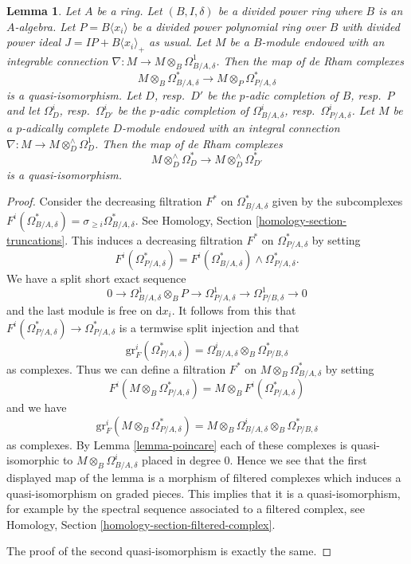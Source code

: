 \documentclass{stacks-project}
\theoremstyle{plain}
\newtheorem{lemma}[subsection]{Lemma}
\theoremstyle{definition}
\theoremstyle{remark}
\numberwithin{equation}{subsection}
\begin{document}
\begin{lemma}
\label{lemma-relative-poincare}
Let $A$ be a ring. Let $(B, I, \delta)$ be a divided power ring
where $B$ is an $A$-algebra.
Let $P = B\langle x_i \rangle$ be a divided power polynomial
ring over $B$ with divided power ideal $J = IP + B\langle x_i \rangle_{+}$
as usual. Let $M$ be a $B$-module endowed with an integrable connection
$\nabla : M \to M \otimes_B \Omega^1_{B/A, \delta}$. Then the map of
de Rham complexes
$$
M \otimes_B \Omega^*_{B/A, \delta}
\longrightarrow
M \otimes_P \Omega^*_{P/A, \delta}
$$
is a quasi-isomorphism. Let $D$, resp.\ $D'$ be the $p$-adic completion of
$B$, resp.\ $P$ and let $\Omega^i_D$, resp.\ $\Omega^i_{D'}$ be the $p$-adic
completion of $\Omega^i_{B/A, \delta}$,
resp.\ $\Omega^i_{P/A, \delta}$. Let $M$ be a $p$-adically complete
$D$-module endowed with an integral connection
$\nabla : M \to M \otimes^\wedge_D \Omega^1_D$.
Then the map of de Rham complexes
$$
M \otimes^\wedge_D \Omega^*_D
\longrightarrow
M \otimes^\wedge_D \Omega^*_{D'}
$$
is a quasi-isomorphism.
\end{lemma}

\begin{proof}
Consider the decreasing filtration $F^*$ on $\Omega^*_{B/A, \delta}$
given by the subcomplexes
$F^i(\Omega^*_{B/A, \delta}) = \sigma_{\geq i}\Omega^*_{B/A, \delta}$.
See Homology, Section \ref{homology-section-truncations}.
This induces a decreasing filtration $F^*$ on $\Omega^*_{P/A, \delta}$
by setting
$$
F^i(\Omega^*_{P/A, \delta}) =
F^i(\Omega^*_{B/A, \delta}) \wedge \Omega^*_{P/A, \delta}.
$$
We have a split short exact sequence
$$
0 \to \Omega^1_{B/A, \delta} \otimes_B P \to
\Omega^1_{P/A, \delta} \to
\Omega^1_{P/B, \delta} \to 0
$$
and the last module is free on $\text{d}x_i$. It follows from this that
$F^i(\Omega^*_{P/A, \delta}) \to \Omega^*_{P/A, \delta}$ is a termwise
split injection and that
$$
\text{gr}^i_F(\Omega^*_{P/A, \delta}) =
\Omega^i_{B/A, \delta} \otimes_B \Omega^*_{P/B, \delta}
$$
as complexes. Thus we can define a filtration $F^*$ on
$M \otimes_B \Omega^*_{B/A, \delta}$ by setting
$$
F^i(M \otimes_B \Omega^*_{P/A, \delta}) =
M \otimes_B F^i(\Omega^*_{P/A, \delta})
$$
and we have
$$
\text{gr}^i_F(M \otimes_B \Omega^*_{P/A, \delta}) =
M \otimes_B \Omega^i_{B/A, \delta} \otimes_B \Omega^*_{P/B, \delta}
$$
as complexes.
By Lemma \ref{lemma-poincare} each of these complexes is
quasi-isomorphic to $M \otimes_B \Omega^i_{B/A, \delta}$ placed in degree $0$.
Hence we see that the first displayed map of the lemma is a morphism of
filtered complexes which induces a quasi-isomorphism on graded pieces. This
implies that it is a quasi-isomorphism, for example by the spectral sequence
associated to a filtered complex, see
Homology, Section \ref{homology-section-filtered-complex}.

\medskip\noindent
The proof of the second quasi-isomorphism is exactly the same.
\end{proof}
\end{document}
